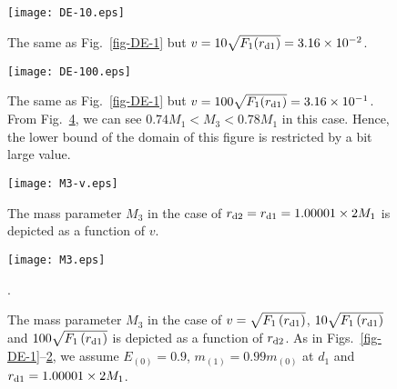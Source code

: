 \documentclass[aps,preprint,preprintnumber,nofootinbib,amsmath,amssymb,ascmac,bm,12pt]{revtex4}
\newcommand{\rdo}{r_{\rm d1}}
\newcommand{\rdt}{r_{\rm d2}}
\newcommand{\mz}{m_{(0)}}
\newcommand{\mo}{m_{(1)}}
\newcommand{\Eze}{E_{(0)}}
\begin{document}
\begin{figure}[htbp]
 \begin{center}
 \texttt{[image: DE-10.eps]}
 \end{center}
 \caption{
The same as Fig.~\ref{fig-DE-1} but $v=10\sqrt{F_1(\rdo)}=3.16\times10^{-2}$. }
 \label{fig-DE-10}
\end{figure}

\begin{figure}[htbp]
 \begin{center}
 \texttt{[image: DE-100.eps]}
 \end{center}
 \caption{
The same as Fig.~\ref{fig-DE-1} but $v=100\sqrt{F_1(\rdo)}=3.16\times10^{-1}$. From Fig.~\ref{fig-M3-r}, we 
can see $0.74M_1<M_3 < 0.78M_1$ in this case. Hence, the lower bound of the domain of this 
figure is restricted by a bit large value. }
 \label{fig-DE-100}
\end{figure}

\begin{figure}[htbp]
 \begin{center}
 \texttt{[image: M3-v.eps]}
 \end{center}
 \caption{
The mass parameter $M_3$ in the case of $\rdt=\rdo=1.00001\times 2M_1$ is depicted as a function of $v$. }
 \label{fig-M3-v}
\end{figure}

\begin{figure}[htbp]
 \begin{center}
 \texttt{[image: M3.eps]}
 \end{center}
 \caption{
The mass parameter $M_3$ in the case of $v=\sqrt{F_1\left(\rdo\right)}$, $10\sqrt{F_1\left(\rdo\right)}$ and $100\sqrt{F_1\left(\rdo\right)}$ 
is depicted as a function of $\rdt$. 
As in Figs.~\ref{fig-DE-1}--\ref{fig-DE-100}, we assume $\Eze=0.9$, $\mo=0.99\mz$ at $d_1$ and $\rdo=1.00001\times 2M_1$.}. 
 \label{fig-M3-r}
\end{figure}
\end{document}
